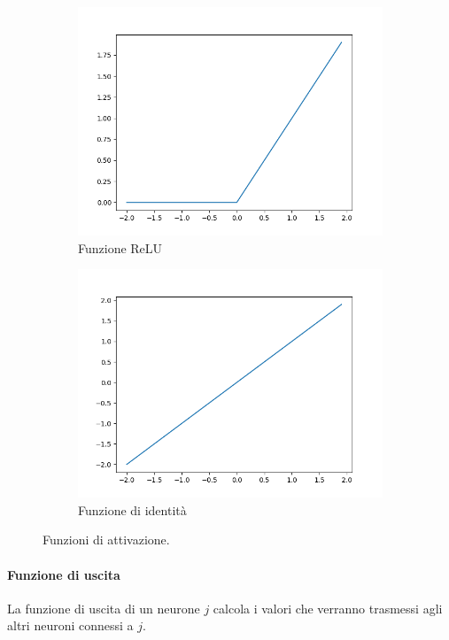 \documentclass[12pt, twoside, letterpaper]{report}
\begin{document}
\begin{figure}
				\begin{subfigure}[]{.5\textwidth}
					\centering
					\includegraphics[width=.9\linewidth]{relu.png}
					\caption{Funzione ReLU}
					\label{fig:relu}
				\end{subfigure}
				\hfill
				\begin{subfigure}[]{.5\textwidth}
					\centering
					\includegraphics[width=.9\linewidth]{identity.png}
					\caption{Funzione di identità}
					\label{fig:identity}
				\end{subfigure}
				
				\caption{Funzioni di attivazione.}
				\label{fig:funzioni di attivazione}
			\end{figure}	
			 	
			 \paragraph{Funzione di uscita} La funzione di uscita di un neurone $j$ calcola i valori che verranno trasmessi agli altri neuroni connessi a $j$. 
			 
\end{document}
